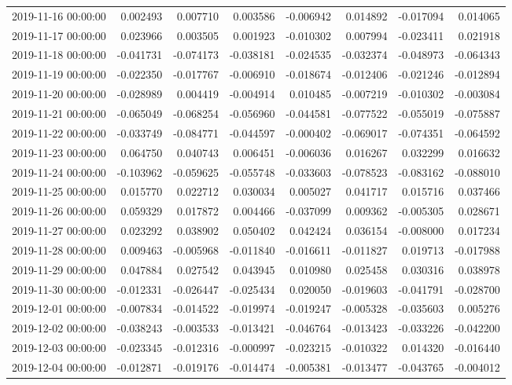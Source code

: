 \begin{tabular}{lrrrrrrr}
2019-11-16 00:00:00 & 0.002493 & 0.007710 & 0.003586 & -0.006942 & 0.014892 & -0.017094 & 0.014065 \\
2019-11-17 00:00:00 & 0.023966 & 0.003505 & 0.001923 & -0.010302 & 0.007994 & -0.023411 & 0.021918 \\
2019-11-18 00:00:00 & -0.041731 & -0.074173 & -0.038181 & -0.024535 & -0.032374 & -0.048973 & -0.064343 \\
2019-11-19 00:00:00 & -0.022350 & -0.017767 & -0.006910 & -0.018674 & -0.012406 & -0.021246 & -0.012894 \\
2019-11-20 00:00:00 & -0.028989 & 0.004419 & -0.004914 & 0.010485 & -0.007219 & -0.010302 & -0.003084 \\
2019-11-21 00:00:00 & -0.065049 & -0.068254 & -0.056960 & -0.044581 & -0.077522 & -0.055019 & -0.075887 \\
2019-11-22 00:00:00 & -0.033749 & -0.084771 & -0.044597 & -0.000402 & -0.069017 & -0.074351 & -0.064592 \\
2019-11-23 00:00:00 & 0.064750 & 0.040743 & 0.006451 & -0.006036 & 0.016267 & 0.032299 & 0.016632 \\
2019-11-24 00:00:00 & -0.103962 & -0.059625 & -0.055748 & -0.033603 & -0.078523 & -0.083162 & -0.088010 \\
2019-11-25 00:00:00 & 0.015770 & 0.022712 & 0.030034 & 0.005027 & 0.041717 & 0.015716 & 0.037466 \\
2019-11-26 00:00:00 & 0.059329 & 0.017872 & 0.004466 & -0.037099 & 0.009362 & -0.005305 & 0.028671 \\
2019-11-27 00:00:00 & 0.023292 & 0.038902 & 0.050402 & 0.042424 & 0.036154 & -0.008000 & 0.017234 \\
2019-11-28 00:00:00 & 0.009463 & -0.005968 & -0.011840 & -0.016611 & -0.011827 & 0.019713 & -0.017988 \\
2019-11-29 00:00:00 & 0.047884 & 0.027542 & 0.043945 & 0.010980 & 0.025458 & 0.030316 & 0.038978 \\
2019-11-30 00:00:00 & -0.012331 & -0.026447 & -0.025434 & 0.020050 & -0.019603 & -0.041791 & -0.028700 \\
2019-12-01 00:00:00 & -0.007834 & -0.014522 & -0.019974 & -0.019247 & -0.005328 & -0.035603 & 0.005276 \\
2019-12-02 00:00:00 & -0.038243 & -0.003533 & -0.013421 & -0.046764 & -0.013423 & -0.033226 & -0.042200 \\
2019-12-03 00:00:00 & -0.023345 & -0.012316 & -0.000997 & -0.023215 & -0.010322 & 0.014320 & -0.016440 \\
2019-12-04 00:00:00 & -0.012871 & -0.019176 & -0.014474 & -0.005381 & -0.013477 & -0.043765 & -0.004012 \\

\end{tabular}

